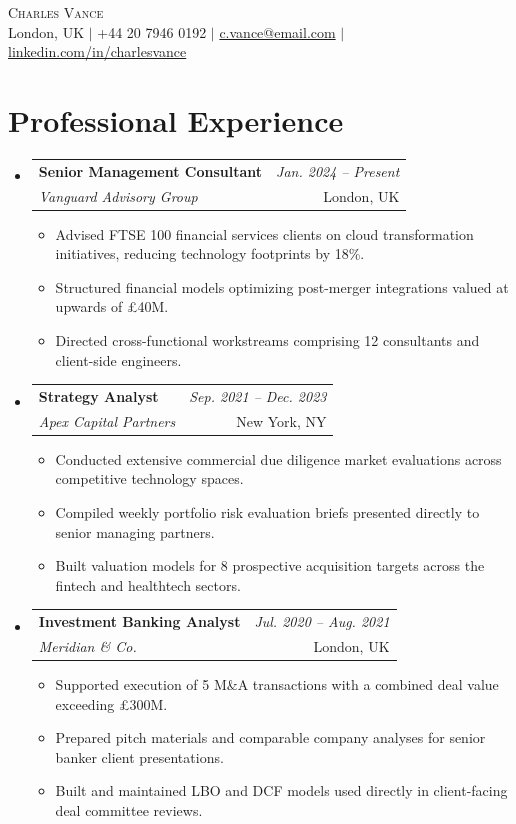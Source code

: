 \documentclass[10pt,letterpaper]{article}
\makeatletter
\newenvironment{entrylist}{\begin{itemize}[leftmargin=0in, label={}]}{\end{itemize}}
\newenvironment{bulletlist}{\begin{itemize}[leftmargin=0.15in, topsep=2pt, itemsep=2pt, parsep=0pt]}{\end{itemize}}
\newcommand{\entry}[4]{
  \vspace{4pt}\item
  \begin{tabular*}{1.0\textwidth}[t]{l@{\extracolsep{\fill}}r}
    \textbf{#1} & \textit{#2} \\
    \textit{#3} & {#4} \\
  \end{tabular*}\vspace{-4pt}
}
\makeatother
\begin{document}
\begin{center}
    {\Huge \scshape Charles Vance} \\ \vspace{6pt}
    \small London, UK $|$ +44 20 7946 0192 $|$ \href{mailto:c.vance@email.com}{c.vance@email.com} $|$ \href{https://linkedin.com/in/charlesvance}{linkedin.com/in/charlesvance}
\end{center}

\section{Professional Experience}
\begin{entrylist}
    \entry{Senior Management Consultant}{Jan. 2024 -- Present}{Vanguard Advisory Group}{London, UK}
    \begin{bulletlist}
        \item Advised FTSE 100 financial services clients on cloud transformation initiatives, reducing technology footprints by 18\%.
        \item Structured financial models optimizing post-merger integrations valued at upwards of £40M.
        \item Directed cross-functional workstreams comprising 12 consultants and client-side engineers.
    \end{bulletlist}

    \entry{Strategy Analyst}{Sep. 2021 -- Dec. 2023}{Apex Capital Partners}{New York, NY}
    \begin{bulletlist}
        \item Conducted extensive commercial due diligence market evaluations across competitive technology spaces.
        \item Compiled weekly portfolio risk evaluation briefs presented directly to senior managing partners.
        \item Built valuation models for 8 prospective acquisition targets across the fintech and healthtech sectors.
    \end{bulletlist}

    \entry{Investment Banking Analyst}{Jul. 2020 -- Aug. 2021}{Meridian \& Co.}{London, UK}
    \begin{bulletlist}
        \item Supported execution of 5 M\&A transactions with a combined deal value exceeding £300M.
        \item Prepared pitch materials and comparable company analyses for senior banker client presentations.
        \item Built and maintained LBO and DCF models used directly in client-facing deal committee reviews.
    \end{bulletlist}


\end{entrylist}
\end{document}
